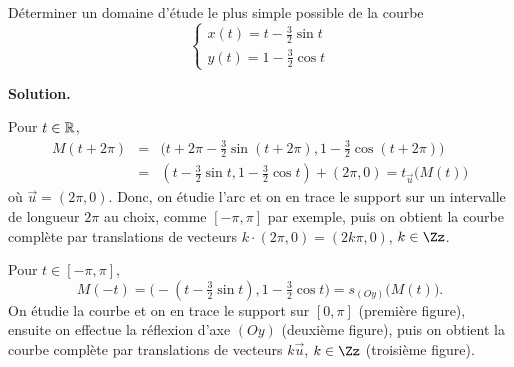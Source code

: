 \documentclass[class=report,crop=false]{standalone}
\begin{document}
\begin{exemple}
Déterminer un domaine d'étude le plus simple possible de la courbe 
$$\left\{
\begin{array}{l}
x(t)=t-\frac32\sin t\\
y(t)=1-\frac32\cos t
\end{array}
\right.$$

\medskip
\textbf{Solution.}

Pour $t\in\mathbb{R}$,
\begin{eqnarray*}
M(t+2\pi)
  &=& \big(t+2\pi-\tfrac32\sin(t+2\pi),1-\tfrac32\cos(t+2\pi)\big)\\
  &=& (t-\tfrac32\sin t,1-\tfrac32\cos t)+(2\pi,0)=t_{\vec{u}} \big(M(t)\big)  
\end{eqnarray*}
où $\vec{u}=(2\pi,0)$. Donc, on étudie l'arc
et on en trace le support sur un intervalle de longueur $2\pi$ au choix, comme
$[-\pi,\pi]$ par exemple, puis on obtient la
courbe complète par translations de vecteurs $k \cdot (2\pi,0)=(2k\pi,0)$, $k\in\Zz$.

Pour $t\in[-\pi,\pi]$,
$$M(-t)=\big(-(t-\tfrac32\sin t),1-\tfrac32\cos t \big)=s_{(Oy)}\big(M(t)\big).$$
On étudie la courbe et on en trace le support sur
$[0,\pi]$ (première figure), ensuite on effectue la
réflexion d'axe $(Oy)$ (deuxième figure), puis on obtient la courbe complète
par translations de vecteurs $k\vec{u}$, $k\in\Zz$ (troisième figure).


\end{exemple}
\end{document}
